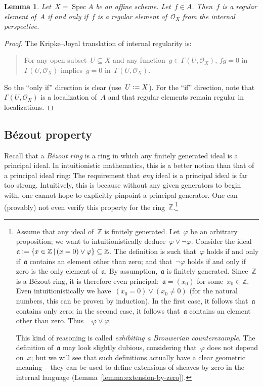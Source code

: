 \documentclass[10pt]{amsart}
\theoremstyle{definition}
\theoremstyle{plain}
\newtheorem{lemma}[defn]{Lemma}
\theoremstyle{remark}
\newcommand{\ZZ}{\mathbb{Z}}
\renewcommand{\O}{\mathcal{O}}
\newcommand{\aaa}{\mathfrak{a}}
\DeclareMathOperator{\Spec}{Spec}
\newcommand{\?}{\,{:}\,}
\renewcommand{\_}{\mathpunct{.}\,}
\newcommand{\defeq}{\vcentcolon=}
\begin{document}
\begin{lemma}\label{lemma:regular-affine}
Let~$X = \Spec A$ be an affine scheme. Let~$f \in A$. Then~$f$ is
a regular element of~$A$ if and only if~$f$ is a regular element of~$\O_X$ from
the internal perspective.\end{lemma}
\begin{proof}The Kripke--Joyal translation of internal regularity is:
\begin{quote}For any open subset~$U \subseteq X$ and any function~$g \in
\Gamma(U,\O_X)$, $fg = 0$ in~$\Gamma(U,\O_X)$ implies~$g = 0$
in~$\Gamma(U,\O_X)$.\end{quote}
So the ``only if'' direction is clear (use~$U \defeq X$). For the ``if'' direction,
note that~$\Gamma(U,\O_X)$ is a localization of~$A$ and that regular elements
remain regular in localizations.
\end{proof}


\subsection{Bézout property} Recall that a \emph{Bézout ring} is a ring in
which any finitely generated ideal is a principal ideal. In intuitionistic
mathematics, this is a better notion than that of a principal ideal ring: The
requirement that \emph{any} ideal is a principal ideal is far too strong.
Intuitively, this is because without any given generators to begin with, one
cannot hope to explicitly pinpoint a principal generator.
One can (provably) not even verify this property for the ring~$\ZZ$.\footnote{Assume
that any ideal of~$\ZZ$ is finitely generated. Let~$\varphi$ be an arbitrary
proposition; we want to intuitionistically deduce~$\varphi \vee \neg\varphi$.
Consider the ideal~$\aaa \defeq \{ x \in \ZZ \,|\, (x = 0) \vee \varphi \}
\subseteq \ZZ$. The definition is such that~$\varphi$ holds if and only
if~$\aaa$ contains an element other than zero; and that~$\neg\varphi$ holds if
and only if zero is the only element of~$\aaa$.
By assumption,~$\aaa$ is finitely generated. Since~$\ZZ$ is a
Bézout ring, it is therefore even principal:~$\aaa = (x_0)$ for some~$x_0 \in
\ZZ$. Even intuitionistically we have~$(x_0 = 0) \vee (x_0 \neq 0)$ (for the
natural numbers, this can be proven by induction). In the first case, it
follows that~$\aaa$ contains only zero; in the second case, it follows
that~$\aaa$ contains an element other than zero. Thus~$\neg\varphi \vee
\varphi$.

This kind of reasoning is called \emph{exhibiting a Brouwerian
counterexample}. The definition of~$\aaa$ may look slightly dubious,
considering that~$\varphi$ does not depend on~$x$; but we will see that such
definitions actually have a clear geometric meaning -- they can be used to
define extensions of sheaves by zero in the internal language
(Lemma~\ref{lemma:extension-by-zero}).}
\end{document}
